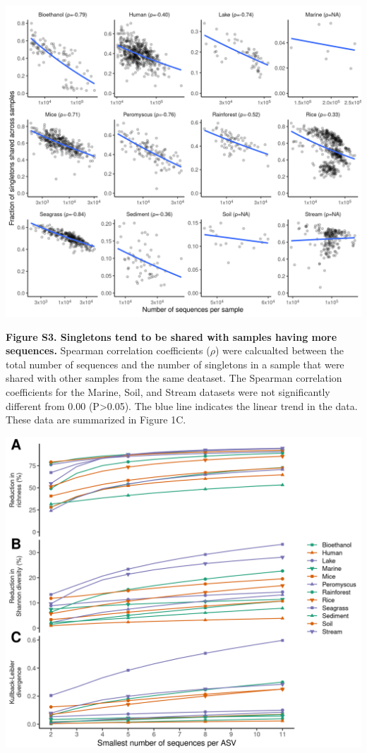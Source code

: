 \documentclass[
]{article}
\begin{document}
\newpage

\includegraphics{figure_s3.png}

\textbf{Figure S3. Singletons tend to be shared with samples having more
sequences.} Spearman correlation coefficients (\(\rho\)) were calcualted
between the total number of sequences and the number of singletons in a
sample that were shared with other samples from the same deataset. The
Spearman correlation coefficients for the Marine, Soil, and Stream
datasets were not significantly different from 0.00 (P\textgreater0.05).
The blue line indicates the linear trend in the data. These data are
summarized in Figure 1C.

\newpage

\includegraphics{figure_s4.png}
\end{document}
